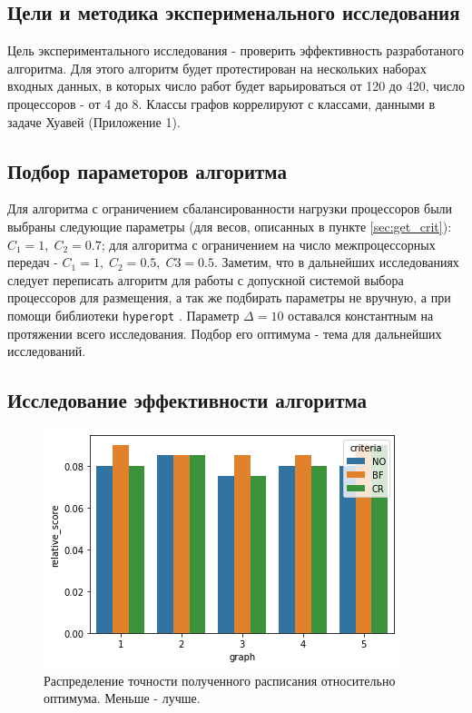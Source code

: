 \subsection{Цели и методика эксперименального исследования}
Цель экспериментального исследования - проверить эффективность разработаного алгоритма. Для этого алгоритм будет протестирован на нескольких наборах входных данных,  в которых число работ будет варьироваться от 120 до 420, число процессоров - от 4 до 8. Классы графов коррелируют с классами, данными в задаче Хуавей (Приложение 1).

\subsection{Подбор параметоров алгоритма}
Для алгоритма с ограничением сбалансированности нагрузки процессоров были выбраны следующие параметры (для весов, описанных в пункте \ref{sec:get_crit}): $C_1 = 1,\;C_2=0.7$; для алгоритма с ограничением на число межпроцессорных передач - $C_1 = 1,\;C_2 = 0.5,\;C3=0.5$. Заметим, что в дальнейших исследованиях следует переписать алгоритм для работы с допускной системой выбора процессоров для размещения, а так же подбирать параметры не вручную, а при помощи библиотеки \lstinline{hyperopt} \cite{Hyperopt}. Параметр $\Delta = 10$ оставался константным на протяжении всего исследования. Подбор его оптимума - тема для дальнейших исследований.

\subsection{Исследование эффективности алгоритма}

\begin{figure}[H]
    \centering
    \includegraphics{imgs/relative_score.png}
    \caption{Распределение точности полученного расписания относительно оптимума. Меньше - лучше.}
    \label{pic:relative_score}
\end{figure}

